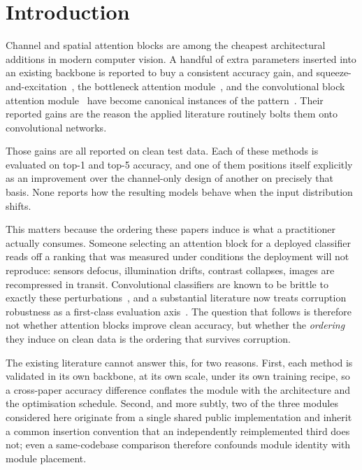 \section{Introduction}

Channel and spatial attention blocks are among the cheapest architectural
additions in modern computer vision. A handful of extra parameters inserted
into an existing backbone is reported to buy a consistent accuracy gain, and
squeeze-and-excitation~\cite{hu2018squeeze}, the bottleneck attention
module~\cite{park2018bam}, and the convolutional block attention
module~\cite{woo2018cbam} have become canonical instances of the
pattern~\cite{guo2022attention}. Their reported gains are the reason the
applied literature routinely bolts them onto convolutional networks.

Those gains are all reported on clean test data. Each of these methods is
evaluated on top-1 and top-5 accuracy, and one of them positions itself
explicitly as an improvement over the channel-only design of another on
precisely that basis. None reports how the resulting models behave when the
input distribution shifts.

This matters because the ordering these papers induce is what a practitioner
actually consumes. Someone selecting an attention block for a deployed
classifier reads off a ranking that was measured under conditions the
deployment will not reproduce: sensors defocus, illumination drifts, contrast
collapses, images are recompressed in transit. Convolutional classifiers are
known to be brittle to exactly these
perturbations~\cite{hendrycks2019benchmarking,geirhos2019imagenet}, and a
substantial literature now treats corruption robustness as a first-class
evaluation axis~\cite{hendrycks2020augmix}. The question that follows is
therefore not whether attention blocks improve clean accuracy, but whether the
\emph{ordering} they induce on clean data is the ordering that survives
corruption.

The existing literature cannot answer this, for two reasons. First, each method
is validated in its own backbone, at its own scale, under its own training
recipe, so a cross-paper accuracy difference conflates the module with the
architecture and the optimisation schedule. Second, and more subtly, two of the
three modules considered here originate from a single shared public
implementation and inherit a common insertion convention that an independently
reimplemented third does not; even a same-codebase comparison therefore
confounds module identity with module placement.

